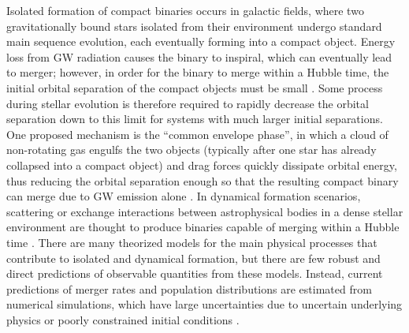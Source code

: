Isolated formation of compact binaries occurs in galactic fields, where two gravitationally bound stars isolated from their environment undergo standard main sequence evolution, each eventually forming into a compact object. Energy loss from GW radiation causes the binary to inspiral, which can eventually lead to merger; however, in order for the binary to merge within a Hubble time, the initial orbital separation of the compact objects must be small \citep{10.1051/0004-6361/201936204,10.1007/s41114-021-00034-3}. Some process during stellar evolution is therefore required to rapidly decrease the orbital separation down to this limit for systems with much larger initial separations. One proposed mechanism is the ``common envelope phase'', in which a cloud of non-rotating gas engulfs the two objects (typically after one star has already collapsed into a compact object) and drag forces quickly dissipate orbital energy, thus reducing the orbital separation enough so that the resulting compact binary can merge due to GW emission alone \citep{10.1038/nature18322}. In dynamical formation scenarios, scattering or exchange interactions between astrophysical bodies in a dense stellar environment are thought to produce binaries capable of merging within a Hubble time \citep{1602.02444}. There are many theorized models for the main physical processes that contribute to isolated and dynamical formation, but there are few robust and direct predictions of observable quantities from these models. Instead, current predictions of merger rates and population distributions are estimated from numerical simulations, which have large uncertainties due to uncertain underlying physics or poorly constrained initial conditions \citep{10.1007/s41114-021-00034-3, 10.1051/0004-6361/201936204, 1806.00001v3, 1308.1546}. 


